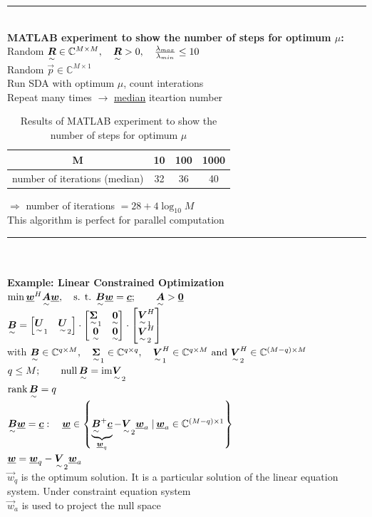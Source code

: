 \rule{\textwidth}{.4pt}\\
\textbf{MATLAB experiment to show the number of steps for optimum $\mu$:}\\
Random $\ma{R}\in\mathbb{C}^{M\times M}, \quad \ma{R}>0, \quad \frac{\lambda_{max}}{\lambda_{min}}\leq 10$\\
Random $\vec{p}\in\mathbb{C}^{M\times 1}$\\
Run SDA with optimum $\mu$, count interations\\
Repeat many times $\rightarrow$ \underline{median} iteartion number\\
\begin{table}[H]
\begin{center}
\begin{tabular}{c||c|c|c}
M&10&100&1000\\
\hline
number of iterations (median)&32&36&40\\
\end{tabular}
\end{center}
\caption{Results of MATLAB experiment to show the number of steps for optimum $\mu$}
\label{tab:res_numb_iter_vs_M}
\end{table}
$\Rightarrow$ number of iterations $=28+4\log_{10}M$\\
This algorithm is perfect for parallel computation\\
\rule{\textwidth}{.4pt}\\ \ \\

\textbf{Example: Linear Constrained Optimization}\\
$\min\vec{w}^H\ma{A}\vec{w}, \quad \text{s. t. } \ma{B}\vec{w}=\vec{c};\qquad \ma{A}>\vec{0}$\\
$\ma{B}=\mat{\ma{U}_1&\ma{U}_2}\cdot \mat{\ma{\Sigma}_1&\ma{0}\\\ma{0}&\ma{0}}\cdot \mat{\ma{V}_1^H\\\ma{V}_2^H}$\\
with $\ma{B}\in\mathbb{C}^{q\times M},\quad \ma{\Sigma}_1\in\mathbb{C}^{q\times q}, \quad \ma{V}_1^H\in\mathbb{C}^{q\times M} \text{ and } \ma{V}_2^H\in\mathbb{C}^{(M-q)\times M}$\\
$q\leq M;\qquad \nullsp\ma{B}=\text{im}\ma{V}_2$\\
$\rank\ma{B}=q$\\
 
$\ma{B}\vec{w}=\vec{c}:\quad \vec{w}\in\left\{\underbrace{\ma{B}^+\vec{c}}_{\vec{w}_q}-\ma{V}_2\vec{w}_a\left.\right|\vec{w}_a\in\mathbb{C}^{(M-q)\times 1}\right\}$\\
$\vec{w}=\vec{w}_q-\ma{V}_2\vec{w}_a$\\
$\vec{w}_q$ is the optimum solution. It is a particular solution of the linear equation system. Under constraint equation system\\
$\vec{w}_a$ is used to project the null space \\

